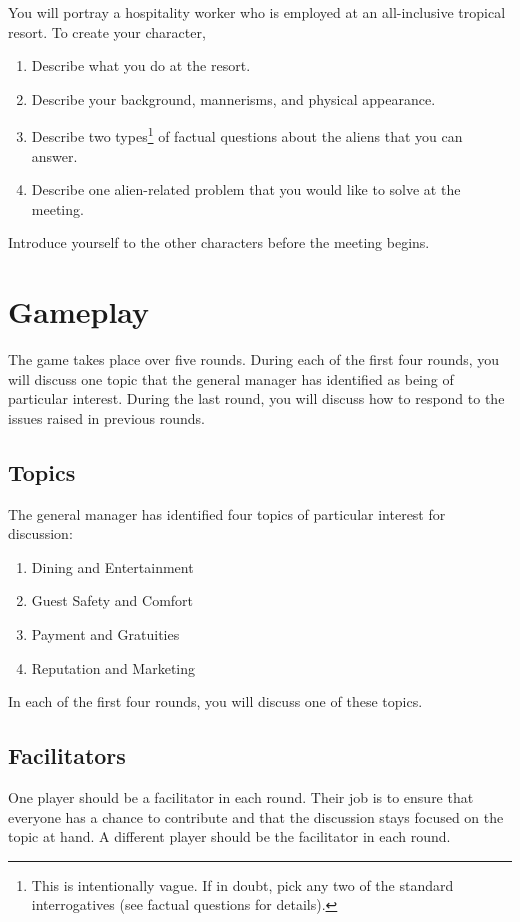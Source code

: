 \documentclass[a6paper, 11pt, parskip=half, DIV=15]{scrartcl}
\begin{document}
You will portray a hospitality worker who is employed at an all-inclusive tropical resort. To create your character,
\begin{enumerate}[nosep]
	\item Describe what you do at the resort.
	\item Describe your background, mannerisms, and physical appearance.
	\item Describe two types\footnote[1]{This is intentionally vague. If in doubt, pick any two of the standard interrogatives (see {\setmainfont{Dakota Rough}factual questions} for details).} of factual questions about the aliens that you can answer.
	\item Describe one alien-related problem that you would like to solve at the meeting.
\end{enumerate}
Introduce yourself to the other characters before the meeting begins.

\section*{Gameplay}
The game takes place over five rounds. 
During each of the first four rounds, you will discuss one topic that the general manager has identified as being of particular interest.
During the last round, you will discuss how to respond to the issues raised in previous rounds. 

\newpage
\enlargethispage{1.75\baselineskip}

\subsection*{Topics}
The general manager has identified four topics of particular interest for discussion:
\begin{enumerate}[nosep]
	\item Dining and Entertainment
	\item Guest Safety and Comfort
	\item Payment and Gratuities
	\item Reputation and Marketing
\end{enumerate}
In each of the first four rounds, you will discuss one of these topics.

\subsection*{Facilitators}
One player should be a facilitator in each round. Their job is to ensure that everyone has a chance to contribute and that the discussion stays focused on the topic at hand. A different player should be the facilitator in each round.
\end{document}
